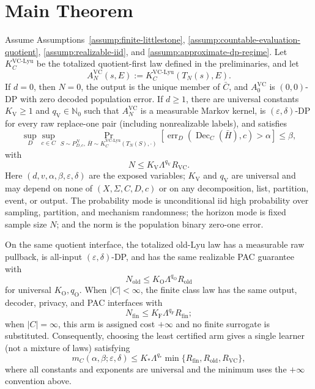 \section{Main Theorem}

\begin{theorem}\label{thm:main}
Assume Assumptions~\ref{assump:finite-littlestone},
\ref{assump:countable-evaluation-quotient},
\ref{assump:realizable-iid}, and
\ref{assump:approximate-dp-regime}.  Let $K_C^{\mathrm{VC\text{-}Lyu}}$
be the totalized quotient-first law defined in the preliminaries, and let
\[
 A_N^{\mathrm{VC}}(s,E):=K_C^{\mathrm{VC\text{-}Lyu}}(T_N(s),E).
\]
If $d=0$, then $N=0$, the output is the unique member of $\bar C$, and
$A_0^{\mathrm{VC}}$ is $(0,0)$-DP with zero decoded population error.  If
$d\ge1$, there are universal constants $K_{\mathrm V}\ge1$ and
$q_{\mathrm V}\in\mathbb N_0$ such that $A_N^{\mathrm{VC}}$ is a measurable
Markov kernel, is $(\varepsilon,\delta)$-DP for every raw replace-one pair
(including nonrealizable labels), and satisfies
\[
 \sup_D\sup_{c\in C}
 \Pr_{S\sim P_{D,c}^{N},\,\bar H\sim K_C^{\mathrm{VC\text{-}Lyu}}(T_N(S),\cdot)}
 \left[\operatorname{err}_D(\operatorname{Dec}_C(\bar H),c)>\alpha\right]
 \le\beta,
\]
with
\[
 N\le K_{\mathrm V}\Lambda^{q_{\mathrm V}}R_{\mathrm{VC}}.
\]
Here $(d,v,\alpha,\beta,\varepsilon,\delta)$ are the exposed variables;
$K_{\mathrm V}$ and $q_{\mathrm V}$ are universal and may depend on none of
$(X,\Sigma,C,D,c)$ or on any decomposition, list, partition, event, or
output.  The probability mode is unconditional iid high probability over
sampling, partition, and mechanism randomness; the horizon mode is fixed
sample size $N$; and the norm is the population binary zero-one error.

On the same quotient interface, the totalized old-Lyu law has a measurable
raw pullback, is all-input $(\varepsilon,\delta)$-DP, and has the same
realizable PAC guarantee with
\[
 N_{\mathrm{old}}\le K_{\mathrm O}\Lambda^{q_{\mathrm O}}R_{\mathrm{old}}
\]
for universal $K_{\mathrm O},q_{\mathrm O}$.  When $|C|<\infty$, the finite
class law has the same output, decoder, privacy, and PAC interfaces with
\[
 N_{\mathrm{fin}}\le K_{\mathrm F}\Lambda^{q_{\mathrm F}}R_{\mathrm{fin}};
\]
when $|C|=\infty$, this arm is assigned cost $+\infty$ and no finite
surrogate is substituted.  Consequently, choosing the least certified arm
gives a single learner (not a mixture of laws) satisfying
\[
 m_C(\alpha,\beta;\varepsilon,\delta)
 \le K_*\Lambda^{q_*}\min\{R_{\mathrm{fin}},R_{\mathrm{old}},R_{\mathrm{VC}}\},
\]
where all constants and exponents are universal and the minimum uses the
$+\infty$ convention above.
\end{theorem}

